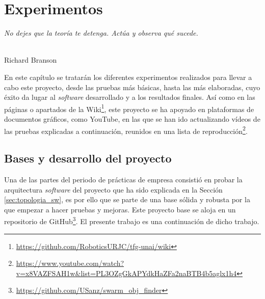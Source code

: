 \chapter{Experimentos}
\label{cap:capitulo5}

\begin{flushright}
\begin{minipage}[]{10cm}
\emph{No dejes que la teoría te detenga. Actúa y observa qué sucede.}\\
\end{minipage}\\

Richard Branson\\
\end{flushright}

\vspace{1cm}

En este capítulo se tratarán los diferentes experimentos realizados para llevar
a cabo este proyecto, desde las pruebas más básicas, hasta las más elaboradas,
cuyo éxito da lugar al \textit{software} desarrollado y a los resultados
finales.
Así como en las páginas o apartados de la Wiki\footnote{
\url{https://github.com/RoboticsURJC/tfg-unai/wiki}}, este proyecto se ha
apoyado en plataformas de documentos gráficos, como YouTube, en las que se han
ido actualizando vídeos de las pruebas explicadas a continuación, reunidos en
una lista de reproducción\footnote{
\url{https://www.youtube.com/watch?v=x8VAZFSAH1w&list=PL3OZgGkAPYdkHaZFa2naBTB4b5aglx1h4}}.



\section{Bases y desarrollo del proyecto}
\label{sec:bases}

Una de las partes del periodo de prácticas de empresa consistió en probar la
arquitectura \textit{software} del proyecto que ha sido explicada en la Sección
\ref{sec:topologia_sw}, es por ello que se parte de una base sólida y robusta
por la que empezar a hacer pruebas y mejoras.
Este proyecto base se aloja en un repositorio de GitHub\footnote{
\url{https://github.com/USanz/swarm\_obj\_finder}}.
El presente trabajo es una continuación de dicho trabajo.
\\

